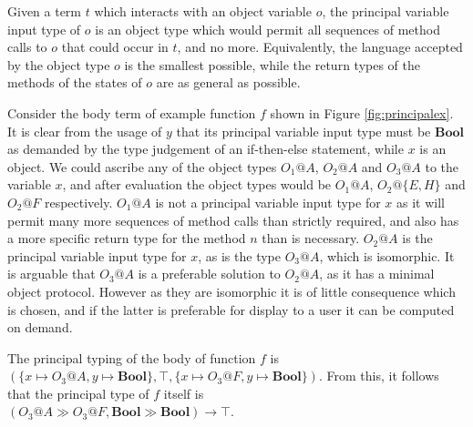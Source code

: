 \documentclass[preprint]{sigplanconf}
\newcommand{\figref}[1]{Figure \ref{#1}}
\newcommand{\boolt}{\mathbf{Bool}}
\begin{document}
Given a term $t$ which interacts with an object variable $o$, the
principal variable input type of $o$ is an object type which would permit
all sequences of method calls to $o$ that could occur in $t$, and no more.
Equivalently, the language accepted by the object type $o$ is the smallest 
possible, while the return types of the methods of the states of $o$
are as general as possible.

Consider the body term of example function $f$ shown in 
\figref{fig:principalex}. It is clear from the usage
of $y$ that its principal variable input type must be $\boolt$ as demanded by the 
type judgement of an if-then-else statement, while $x$ is an object.
We could ascribe any of the object types $O_1@A$, $O_2@A$ and $O_3@A$ to the 
variable $x$, and after evaluation the object types would be $O_1@A$, $O_2@\{E,H\}$
and $O_2@F$ respectively.
$O_1@A$ is not a principal variable input type for $x$ as it will permit many more 
sequences of method calls 
than strictly required, and also has a more
specific return type for the method $n$ than is necessary. $O_2@A$ 
is the principal variable input type for $x$, as is the type $O_3@A$, which is
isomorphic. It is arguable that $O_3@A$ is a preferable solution to
$O_2@A$, as it has a minimal object protocol. However as they are isomorphic
it is of little consequence which is chosen, and if the latter is preferable
for display to a user it can be computed on demand.


The principal typing of the body of function $f$ is \\ 
$(\{x \mapsto O_3@A, y \mapsto \boolt \}, \top, \{ x \mapsto O_3@F, y \mapsto \boolt \})$.
From this, it follows that the principal type of $f$ itself is \\
$(O_3@A \gg O_3@F, \boolt \gg \boolt) \rightarrow \top$.
\end{document}
